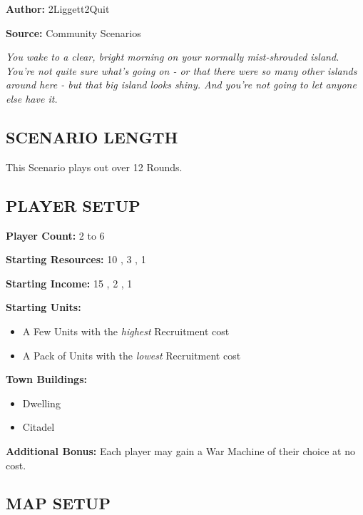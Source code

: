 
\begin{multicols*}{2}

\textbf{Author:} 2Liggett2Quit

\textbf{Source:} Community Scenarios

\textit{You wake to a clear, bright morning on your normally mist-shrouded island. You're not quite sure what's going on - or that there were so many other islands around here - but that big island looks shiny. And you're not going to let anyone else have it.}

\subsection*{\MakeUppercase{Scenario Length}}

This Scenario plays out over 12 Rounds.

\subsection*{\MakeUppercase{Player Setup}}
\textbf{Player Count:} 2 to 6

\textbf{Starting Resources:} 10 , 3 , 1 

\textbf{Starting Income:} 15 , 2 , 1 

\textbf{Starting Units:}
\begin{itemize}
  \item A Few  Units with the \textit{highest} Recruitment cost
  \item A Pack of  Units with the \textit{lowest} Recruitment cost
\end{itemize}

\textbf{Town Buildings:}
\begin{itemize}
  \item {} Dwelling
  \item Citadel
\end{itemize}

\textbf{Additional Bonus:} Each player may gain a War Machine of their choice at no cost.

\subsection*{\MakeUppercase{Map Setup}}


\end{multicols*}
